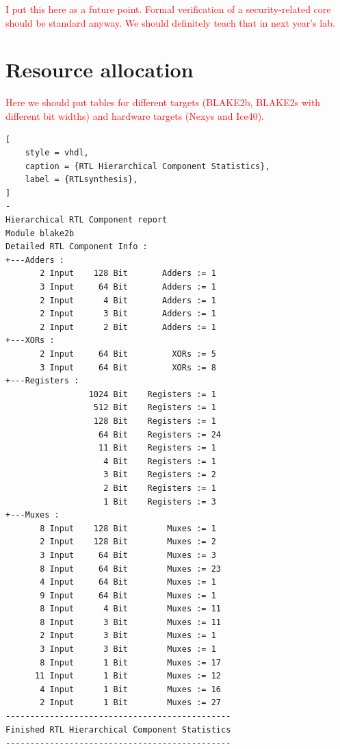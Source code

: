 \documentclass[%
	a4paper,
]
{article}
\newcommand{\todo}[1]{\textcolor{red}{#1}}
\begin{document}
\todo{I put this here as a future point. Formal verification of a
security-related core should be standard anyway. We should definitely teach
that in next year's lab.}
%
%
\section{Resource allocation}
\label{sec:resource-allocation}

\todo{Here we should put tables for different targets (BLAKE2b, BLAKE2s with
different bit widths) and hardware targets (Nexys and Ice40).}

\begin{lstlisting}[
	style = vhdl,
	caption = {RTL Hierarchical Component Statistics},
	label = {RTLsynthesis},
]
-
Hierarchical RTL Component report 
Module blake2b 
Detailed RTL Component Info : 
+---Adders : 
	   2 Input    128 Bit       Adders := 1     
	   3 Input     64 Bit       Adders := 1     
	   2 Input      4 Bit       Adders := 1     
	   2 Input      3 Bit       Adders := 1     
	   2 Input      2 Bit       Adders := 1     
+---XORs : 
	   2 Input     64 Bit         XORs := 5     
	   3 Input     64 Bit         XORs := 8     
+---Registers : 
	             1024 Bit    Registers := 1     
	              512 Bit    Registers := 1     
	              128 Bit    Registers := 1     
	               64 Bit    Registers := 24    
	               11 Bit    Registers := 1    
	                4 Bit    Registers := 1     
	                3 Bit    Registers := 2     
	                2 Bit    Registers := 1     
	                1 Bit    Registers := 3     
+---Muxes : 
	   8 Input    128 Bit        Muxes := 1     
	   2 Input    128 Bit        Muxes := 2     
	   3 Input     64 Bit        Muxes := 3     
	   8 Input     64 Bit        Muxes := 23    
	   4 Input     64 Bit        Muxes := 1     
	   9 Input     64 Bit        Muxes := 1     
	   8 Input      4 Bit        Muxes := 11    
	   8 Input      3 Bit        Muxes := 11    
	   2 Input      3 Bit        Muxes := 1     
	   3 Input      3 Bit        Muxes := 1     
	   8 Input      1 Bit        Muxes := 17    
	  11 Input      1 Bit        Muxes := 12    
	   4 Input      1 Bit        Muxes := 16    
	   2 Input      1 Bit        Muxes := 27    
----------------------------------------------
Finished RTL Hierarchical Component Statistics
----------------------------------------------

\end{lstlisting}
%
%
\end{document}
